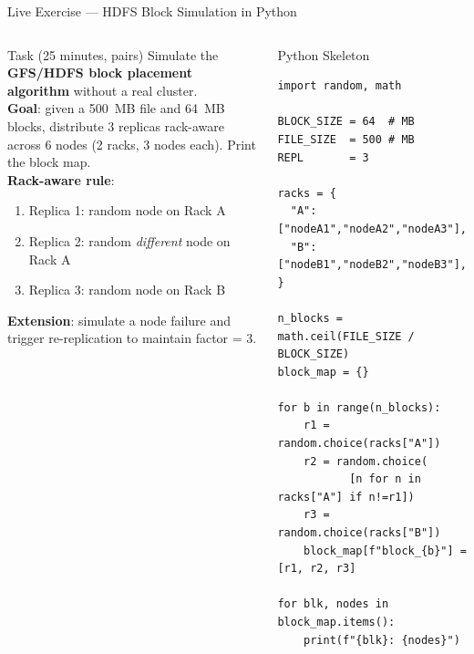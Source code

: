 \documentclass[aspectratio=169,10pt]{beamer}
\begin{document}
\begin{frame}[fragile]{Live Exercise — HDFS Block Simulation in Python}
  \begin{columns}[T]
      \begin{block}{Task (25 minutes, pairs)}
        Simulate the \textbf{GFS/HDFS block placement algorithm}
        without a real cluster.\\[5pt]
        \textbf{Goal}: given a 500~MB file and 64~MB blocks,
        distribute 3 replicas rack-aware across 6 nodes
        (2 racks, 3 nodes each). Print the block map.\\[5pt]
        \textbf{Rack-aware rule}:
        \begin{enumerate}\setlength\itemsep{1pt}
          \item Replica 1: random node on Rack A
          \item Replica 2: random \emph{different} node on Rack A
          \item Replica 3: random node on Rack B
        \end{enumerate}
        \textbf{Extension}: simulate a node failure and trigger
        re-replication to maintain factor = 3.
      \end{block}

      \begin{exampleblock}{Python Skeleton}
        \scriptsize
        \begin{verbatim}
import random, math

BLOCK_SIZE = 64  # MB
FILE_SIZE  = 500 # MB
REPL       = 3

racks = {
  "A": ["nodeA1","nodeA2","nodeA3"],
  "B": ["nodeB1","nodeB2","nodeB3"],
}

n_blocks = math.ceil(FILE_SIZE / BLOCK_SIZE)
block_map = {}

for b in range(n_blocks):
    r1 = random.choice(racks["A"])
    r2 = random.choice(
           [n for n in racks["A"] if n!=r1])
    r3 = random.choice(racks["B"])
    block_map[f"block_{b}"] = [r1, r2, r3]

for blk, nodes in block_map.items():
    print(f"{blk}: {nodes}")
        \end{verbatim}
      \end{exampleblock}
  \end{columns}
\end{frame}

\end{document}
